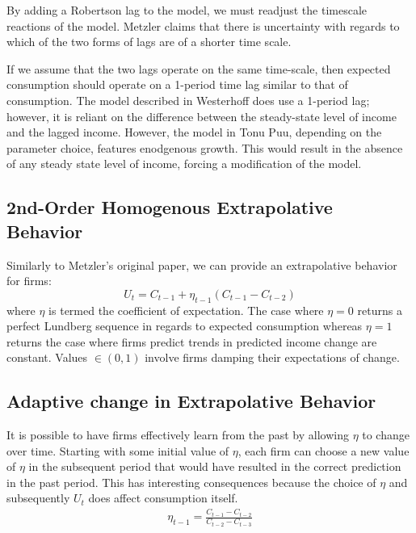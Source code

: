 \documentclass[]{article}
\begin{document}
By adding a Robertson lag to the model, we must readjust the timescale reactions of the model. Metzler claims that there is uncertainty with regards to which of the two forms of lags are of a shorter time scale. 

If we assume that the two lags operate on the same time-scale, then expected consumption should operate on a 1-period time lag similar to that of consumption. The model described in Westerhoff does use a 1-period lag; however, it is reliant on the difference between the steady-state level of income and the lagged income. However, the model in Tonu Puu, depending on the parameter choice, features enodgenous growth. This would result in the absence of any steady state level of income, forcing a modification of the model.
\subsection*{2nd-Order Homogenous Extrapolative Behavior}
Similarly to Metzler's original paper, we can provide an extrapolative behavior for firms:
\begin{equation}
	U_t=C_{t-1}+\eta_{t-1}(C_{t-1}-C_{t-2})
\end{equation}
where $\eta$ is termed the coefficient of expectation. The case where $\eta=0$ returns a perfect Lundberg sequence in regards to expected consumption whereas $\eta=1$ returns the case where firms predict trends in predicted income change are constant. Values $\in(0,1)$ involve firms damping their expectations of change. 
\subsection*{Adaptive change in Extrapolative Behavior}
It is possible to have firms effectively learn from the past by allowing $\eta$ to change over time. Starting with some initial value of $\eta$, each firm can choose a new value of $\eta$ in the subsequent period that would have resulted in the correct prediction in the past period. This has interesting consequences because the choice of $\eta$ and subsequently $U_t$ does affect consumption itself. 
\begin{gather}
	\eta_{t-1} = \frac{C_{t-1}-C_{t-2}}{C_{t-2}-C_{t-3}}
\end{gather}
\end{document}
